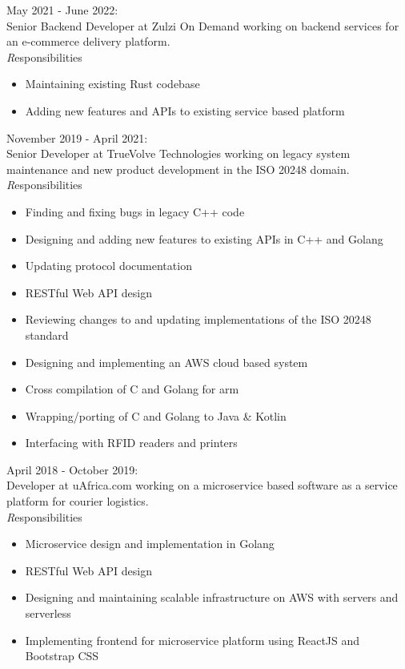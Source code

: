 \documentclass[11pt,a4paper]{article}
\begin{document}
{\noindent\large May 2021 - June 2022:}\\
Senior Backend Developer at Zulzi On Demand working on backend services for an e-commerce delivery platform.
\\

	{\emph Responsibilities}
	\begin{itemize}
                   \item Maintaining existing Rust codebase 
                   \item Adding new features and APIs to existing service based platform
	\end{itemize}

{\noindent\large November 2019 - April 2021:}\\

Senior Developer at TrueVolve Technologies working on legacy system maintenance and new product development in the ISO 20248 domain.
\\

	{\emph Responsibilities}
	\begin{itemize}
		\item Finding and fixing bugs in legacy C++ code
		\item Designing and adding new features to existing APIs in C++ and Golang
		\item Updating protocol documentation
		\item RESTful Web API design
		\item Reviewing changes to and updating implementations of the ISO 20248 standard 
		\item Designing and implementing an AWS cloud based system
		\item Cross compilation of C and Golang for arm
		\item Wrapping/porting of C and Golang to Java \& Kotlin
		\item Interfacing with RFID readers and printers
	\end{itemize}
	
{\noindent\large April 2018 - October 2019:}\\

Developer at uAfrica.com working on a microservice based software as a service platform for courier logistics.
\\

	{\emph Responsibilities}
	\begin{itemize}
	\item Microservice design and implementation in Golang
	\item RESTful Web API design
	\item Designing and maintaining scalable infrastructure on AWS with servers and serverless
	\item Implementing frontend for microservice platform using ReactJS and Bootstrap CSS
	\end{itemize}
\end{document}
